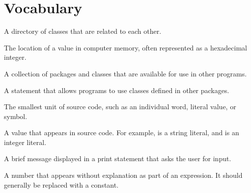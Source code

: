 
\section{Vocabulary}

\begin{description}

A directory of classes that are related to each other.

The location of a value in computer memory, often represented as a hexadecimal integer.

A collection of packages and classes that are available for use in other programs.





A statement that allows programs to use classes defined in other packages.

The smallest unit of source code, such as an individual word, literal value, or symbol.



A value that appears in source code.
For example,  is a string literal, and  is an integer literal.

A brief message displayed in a print statement that asks the user for input.

A number that appears without explanation as part of an expression.
It should generally be replaced with a constant.


\end{description}
